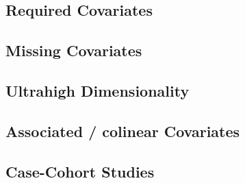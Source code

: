 \subsection{Required Covariates}
\subsection{Missing Covariates}
\subsection{Ultrahigh Dimensionality}
\subsection{Associated / colinear Covariates}
\subsection{Case-Cohort Studies}

\fi